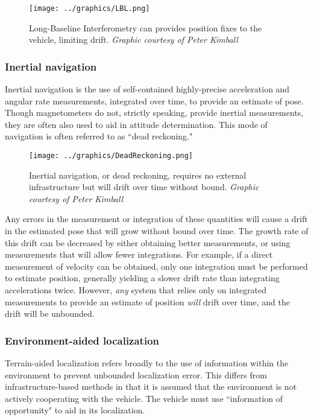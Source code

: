 \begin{figure}[htbp]
   \centering
   \texttt{[image: ../graphics/LBL.png]} %
   \caption{Long-Baseline Interferometry can provides position fixes to the vehicle, limiting drift. \emph{Graphic courtesy of Peter Kimball}}
   \label{fig:LBL}
\end{figure}

\subsubsection{Inertial navigation}

Inertial navigation is the use of self-contained highly-precise acceleration and angular rate measurements, integrated over time, to provide an estimate of pose. Though magnetometers do not, strictly speaking, provide inertial measurements, they are often also used to aid in attitude determination. This mode of navigation is often referred to as ``dead reckoning."

\begin{figure}[htbp]
   \centering
   \texttt{[image: ../graphics/DeadReckoning.png]} %
   \caption{Inertial navigation, or dead reckoning, requires no external infrastructure but will drift over time without bound. \emph{Graphic courtesy of Peter Kimball}}
   \label{fig:inertialNav}
\end{figure}

Any errors in the measurement or integration of these quantities will cause a drift in the estimated pose that will grow without bound over time. The growth rate of this drift can be decreased by either obtaining better measurements, or using measurements that will allow fewer integrations. For example, if a direct measurement of velocity can be obtained, only one integration must be performed to estimate position, generally yielding a slower drift rate than integrating accelerations twice. However, \emph{any} system that relies only on integrated measurements to provide an estimate of position \emph{will} drift over time, and the drift will be unbounded. 

\subsubsection{Environment-aided localization}

Terrain-aided localization refers broadly to the use of information within the environment to prevent unbounded localization error. This differs from infrastructure-based methods in that it is assumed that the environment is not actively cooperating with the vehicle. The vehicle must use ``information of opportunity" to aid in its localization. 

